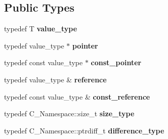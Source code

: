 \subsection*{Public Types}
\begin{DoxyCompactItemize}
\item 
\hypertarget{classTestAllocator_a04478be3f65c39824166243df1039bce}{}typedef T {\bfseries value\+\_\+type}\label{classTestAllocator_a04478be3f65c39824166243df1039bce}

\item 
\hypertarget{classTestAllocator_aac7a087010eb7ef1bccc375191ef59f7}{}typedef value\+\_\+type $\ast$ {\bfseries pointer}\label{classTestAllocator_aac7a087010eb7ef1bccc375191ef59f7}

\item 
\hypertarget{classTestAllocator_a5206d98b2d7be590a2c6e8d9ba5fd875}{}typedef const value\+\_\+type $\ast$ {\bfseries const\+\_\+pointer}\label{classTestAllocator_a5206d98b2d7be590a2c6e8d9ba5fd875}

\item 
\hypertarget{classTestAllocator_a361ac233e0a62d8c83f824c9a3059856}{}typedef value\+\_\+type \& {\bfseries reference}\label{classTestAllocator_a361ac233e0a62d8c83f824c9a3059856}

\item 
\hypertarget{classTestAllocator_aae9516a05d6ba66814107a47b5ef9377}{}typedef const value\+\_\+type \& {\bfseries const\+\_\+reference}\label{classTestAllocator_aae9516a05d6ba66814107a47b5ef9377}

\item 
\hypertarget{classTestAllocator_ae7b85ad8adb9dd6a8e8f18795ded4293}{}typedef C\+\_\+\+Namespace\+::size\+\_\+t {\bfseries size\+\_\+type}\label{classTestAllocator_ae7b85ad8adb9dd6a8e8f18795ded4293}

\item 
\hypertarget{classTestAllocator_adfc320e6968ecaa4ea57ecde91ab496a}{}typedef C\+\_\+\+Namespace\+::ptrdiff\+\_\+t {\bfseries difference\+\_\+type}\label{classTestAllocator_adfc320e6968ecaa4ea57ecde91ab496a}

\end{DoxyCompactItemize}
